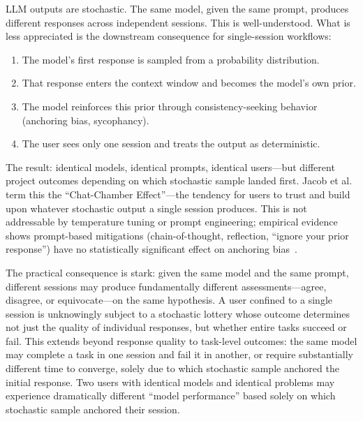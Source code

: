 \documentclass[11pt]{article}
\begin{document}
LLM outputs are stochastic. The same model, given the same prompt, produces different responses across independent sessions. This is well-understood. What is less appreciated is the downstream consequence for single-session workflows:

\begin{enumerate}[label=\arabic*.]
  \item The model's first response is sampled from a probability distribution.
  \item That response enters the context window and becomes the model's own prior.
  \item The model reinforces this prior through consistency-seeking behavior (anchoring bias, sycophancy).
  \item The user sees only one session and treats the output as deterministic.
\end{enumerate}

The result: identical models, identical prompts, identical users---but different project outcomes depending on which stochastic sample landed first. Jacob et al.~\citep{jacob2025chatchamber} term this the ``Chat-Chamber Effect''---the tendency for users to trust and build upon whatever stochastic output a single session produces. This is not addressable by temperature tuning or prompt engineering; empirical evidence shows prompt-based mitigations (chain-of-thought, reflection, ``ignore your prior response'') have no statistically significant effect on anchoring bias~\citep{feng2026anchoring}.

The practical consequence is stark: given the same model and the same prompt, different sessions may produce fundamentally different assessments---agree, disagree, or equivocate---on the same hypothesis. A user confined to a single session is unknowingly subject to a stochastic lottery whose outcome determines not just the quality of individual responses, but whether entire tasks succeed or fail. This extends beyond response quality to task-level outcomes: the same model may complete a task in one session and fail it in another, or require substantially different time to converge, solely due to which stochastic sample anchored the initial response. Two users with identical models and identical problems may experience dramatically different ``model performance'' based solely on which stochastic sample anchored their session.
\end{document}
